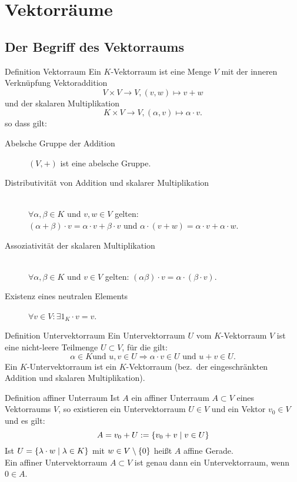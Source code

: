 \documentclass[main.tex]{subfiles}
\begin{document}
\section*{Vektorräume}
\subsection*{Der Begriff des Vektorraums}
\begin{karte}{Definition Vektorraum}
    Ein \( K \)-Vektorraum ist eine Menge \(V\) mit der inneren 
    Verknüpfung Vektoraddition 
    \[ V \times V \rightarrow V, (v,w) \mapsto v + w \]
    und der skalaren Multiplikation 
    \[ K \times V \rightarrow V, (\alpha, v) \mapsto 
    \alpha \cdot v. \]
    so dass gilt: 
    \begin{description}
        \item[Abelsche Gruppe der Addition]
        \( (V,+) \) ist eine abelsche Gruppe.  
        \item[Distributivität von Addition und skalarer Multiplikation] \hfill \\ 
        \( \forall \alpha, \beta \in K\) und \( v, w \in V\) gelten: \\
        \( (\alpha + \beta) \cdot v =  \alpha \cdot v + \beta \cdot v\)
        und 
        \( \alpha \cdot ( v + w) = \alpha \cdot v + \alpha \cdot w\).
        \item[Assoziativität der skalaren Multiplikation] \hfill \\
        \( \forall \alpha, \beta \in K\) und \( v \in V\) gelten:
        \((\alpha \beta) \cdot v = \alpha \cdot (\beta \cdot v)\).
        \item[Existenz eines neutralen Elements]
        \( \forall v \in V : \exists 1_K \cdot v = v\).
    \end{description}
\end{karte}
\begin{karte}{Definition Untervektorraum}
    Ein Untervektorraum \(U\) vom \(K\)-Vektorraum \(V\) ist eine nicht-leere
    Teilmenge \(U \subset V\), für die gilt: 
    \[\alpha \in K \text {und } u, v \in U \Rightarrow \alpha \cdot v \in U
    \text{ und } u + v \in U.\]
    Ein \(K\)-Untervektorraum ist ein \(K\)-Vektorraum 
    (bez.\ der eingeschränkten Addition und skalaren Multiplikation).
\end{karte}
\begin{karte}{Definition affiner Unterraum}
    Ist \(A\) ein affiner Unterraum \(A \subset V\) eines Vektorraums \(V\),
    so existieren ein Untervektorraum \(U \in V\) und ein Vektor \(v_0 \in V\) 
    und es gilt: 
    \[A = v_0 + U := \{v_0 + v \;\vert \; v \in U\}\] 
    Ist \(U = \{\lambda \cdot w \;\vert \; \lambda \in K\}\) 
    mit \(w \in V \setminus \{0\}\) heißt \(A\) affine Gerade. \\
    Ein affiner Untervektorraum \(A \subset V\) ist genau 
    dann ein Untervektorraum, wenn \(0 \in A\).
\end{karte}
\end{document}

